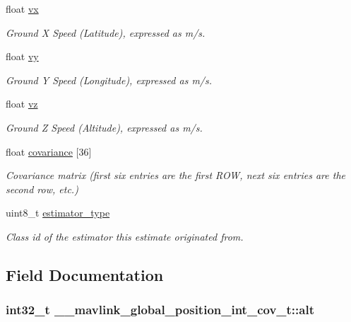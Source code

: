 \begin{DoxyCompactItemize}
float \hyperlink{struct____mavlink__global__position__int__cov__t_af5385abecc85392ad2428fa2e96c1da5}{vx}
\begin{DoxyCompactList}\small\item\em Ground X Speed (Latitude), expressed as m/s. \end{DoxyCompactList}\item 
float \hyperlink{struct____mavlink__global__position__int__cov__t_a35289a43dbe67f4efd300a80c2c7cd31}{vy}
\begin{DoxyCompactList}\small\item\em Ground Y Speed (Longitude), expressed as m/s. \end{DoxyCompactList}\item 
float \hyperlink{struct____mavlink__global__position__int__cov__t_a78f2bb8e9a8890c3f1a64ba05c3870e2}{vz}
\begin{DoxyCompactList}\small\item\em Ground Z Speed (Altitude), expressed as m/s. \end{DoxyCompactList}\item 
float \hyperlink{struct____mavlink__global__position__int__cov__t_a75970ec38bd2ae98af576c9f6dc696e3}{covariance} \mbox{[}36\mbox{]}
\begin{DoxyCompactList}\small\item\em Covariance matrix (first six entries are the first R\+O\+W, next six entries are the second row, etc.) \end{DoxyCompactList}\item 
uint8\+\_\+t \hyperlink{struct____mavlink__global__position__int__cov__t_af217c2028212752c8faaddab7ae536a6}{estimator\+\_\+type}
\begin{DoxyCompactList}\small\item\em Class id of the estimator this estimate originated from. \end{DoxyCompactList}\end{DoxyCompactItemize}


\subsection{Field Documentation}
\hypertarget{struct____mavlink__global__position__int__cov__t_abd44c2ddd64fb85dc923a847bd9f64fa}{
\subsubsection[{alt}]{\setlength{\rightskip}{0pt plus 5cm}int32\+\_\+t \+\_\+\+\_\+mavlink\+\_\+global\+\_\+position\+\_\+int\+\_\+cov\+\_\+t\+::alt}}\label{struct____mavlink__global__position__int__cov__t_abd44c2ddd64fb85dc923a847bd9f64fa}


